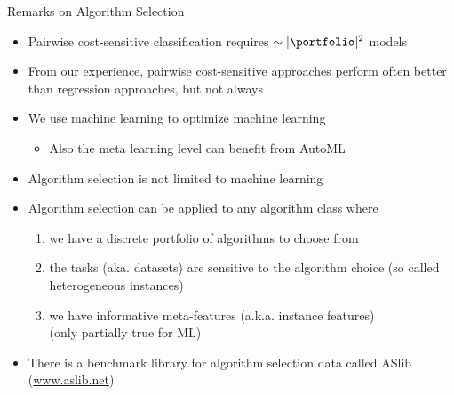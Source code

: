 \begin{frame}[c]{Remarks on Algorithm Selection}

\begin{itemize}
	\item Pairwise cost-sensitive classification requires $\sim |\portfolio|^2$ models
	\pause
	\item From our experience, pairwise cost-sensitive approaches perform often better than regression approaches, but not always
	\pause
	\item We use machine learning to optimize machine learning
	\begin{itemize}
		\item Also the meta learning level can benefit from AutoML\\ 
	\end{itemize}
	\pause
	\item Algorithm selection is not limited to machine learning
	\item Algorithm selection can be applied to any algorithm class where 
	\begin{enumerate}
		\pause
		\item we have a discrete portfolio of algorithms to choose from
		\pause
		\item the tasks (aka. datasets) are sensitive to the algorithm choice (so called heterogeneous instances)
		\pause
		\item we have informative meta-features (a.k.a. instance features)\\
		(only partially true for ML)
	\end{enumerate}
	\pause
	\item There is a benchmark library for algorithm selection data called ASlib (\url{www.aslib.net}) 
\end{itemize}

\end{frame}
